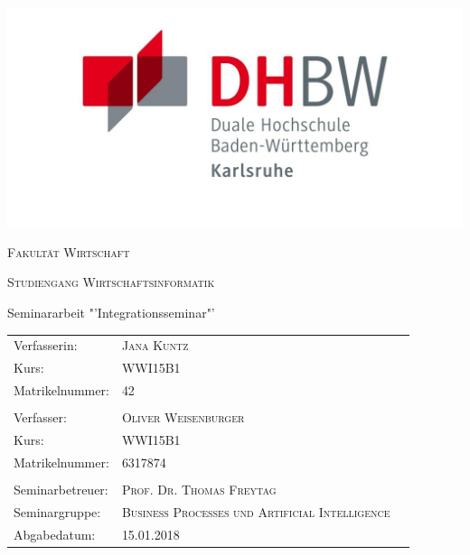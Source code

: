 \begin{titlepage}
	\centering
	
	\includegraphics{pictures/dhbw_logo.png}
	\vspace{1cm}
	\par
	{\scshape\LARGE Fakultät Wirtschaft\par}
	\vspace{0.5cm}
	{\scshape\Large Studiengang Wirtschaftsinformatik\par}
	\vspace{1cm}
	{\large\bfseries \ThesisTitle \par}
	\vspace{1cm}
	{\Large Seminararbeit "'Integrationsseminar"'\par}

	\vfill
	
	\begin{center}
	\begin{tabularx}{\columnwidth}{XXl}
	Verfasserin: &  \textsc{Jana Kuntz}\\
	Kurs: & \textsc{WWI15B1} \\
	Matrikelnummer: & \textsc{42} \\\\
	Verfasser: & \textsc{Oliver Weisenburger} \\
	Kurs: & \textsc{WWI15B1} \\
	Matrikelnummer: & \textsc{6317874} \\\\
	Seminarbetreuer: &  \textsc{Prof. Dr. Thomas Freytag} 	\\
	Seminargruppe:&  \textsc{Business Processes und Artificial Intelligence} 	 \\
	Abgabedatum: & \textsc{15.01.2018} \\
\end{tabularx} 
 \end{center}

\end{titlepage}
